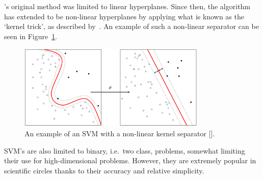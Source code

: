 \citeauthor{vapnik1995support}'s original method was limited to linear hyperplanes. Since then, the algorithm has extended to be non-linear hyperplanes by applying what is known as the `kernel trick', as described by~\cite{amari1999improving}. An example of such a non-linear separator can be seen in Figure~\ref{fig:chap2-svm-nonlinear}.

\begin{figure}
  \centering
  \includegraphics[width=0.8\textwidth]{figures/chapter2/svm_nonlinear}
  \caption[An example of an SVM with a non-linear kernel separator.]{An example of an SVM with a non-linear kernel separator [\cite{kernel-wiki-pic}].}
\label{fig:chap2-svm-nonlinear}
\end{figure}

SVM's are also limited to  binary, i.e.\ two class, problems, somewhat limiting their use for high-dimensional problems. However, they are extremely popular in scientific circles thanks to their accuracy and relative simplicity. 
